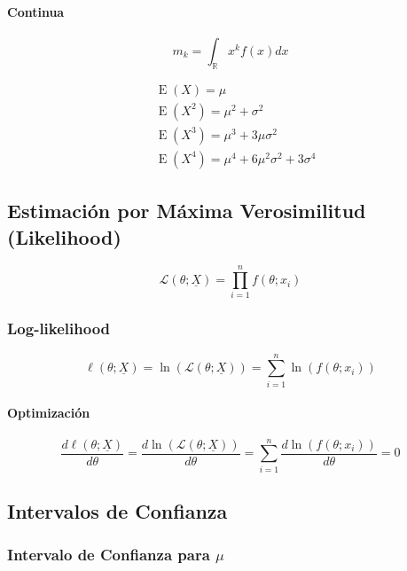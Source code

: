 \documentclass[
]{article}
\begin{document}
\hypertarget{continua}{%
\paragraph{Continua}\label{continua}}

\[
    m_{k} = \int_{\mathbb{R}} x^k f(x) dx
\]

\[
\begin{align*}
    & \operatorname{E}(X) = \mu \\
    & \operatorname{E}(X^2) = \mu^2 + \sigma^2 \\
    & \operatorname{E}(X^3) = \mu^3 + 3\mu\sigma^2 \\
    & \operatorname{E}(X^4) = \mu^4 + 6\mu^2\sigma^2 + 3\sigma^4
\end{align}
\]

\hypertarget{estimaciuxf3n-por-muxe1xima-verosimilitud-likelihood}{%
\subsection{Estimación por Máxima Verosimilitud
(Likelihood)}\label{estimaciuxf3n-por-muxe1xima-verosimilitud-likelihood}}

\[
    \mathcal{L}(\theta; \underline{X}) = \prod_{i=1}^n f(\theta; x_i)
\]

\hypertarget{log-likelihood}{%
\subsubsection{Log-likelihood}\label{log-likelihood}}

\[
    \ell(\theta; \underline{X}) = \ln(\mathcal{L}(\theta; \underline{X})) = \sum_{i=1}^n \ln(f(\theta; x_i))
\]

\hypertarget{optimizaciuxf3n}{%
\paragraph{Optimización}\label{optimizaciuxf3n}}

\[
    \frac{d\ell(\theta; \underline{X})}{d\theta} = \frac{d\ln(\mathcal{L}(\theta; \underline{X}))}{d\theta} = \sum_{i=1}^n \frac{d\ln(f(\theta; x_i))}{d\theta} = 0
\]

\hypertarget{intervalos-de-confianza}{%
\subsection{Intervalos de Confianza}\label{intervalos-de-confianza}}

\hypertarget{intervalo-de-confianza-para-mu}{%
\subsubsection{\texorpdfstring{Intervalo de Confianza para
\(\mu\)}{Intervalo de Confianza para \textbackslash mu}}\label{intervalo-de-confianza-para-mu}}
\end{document}
